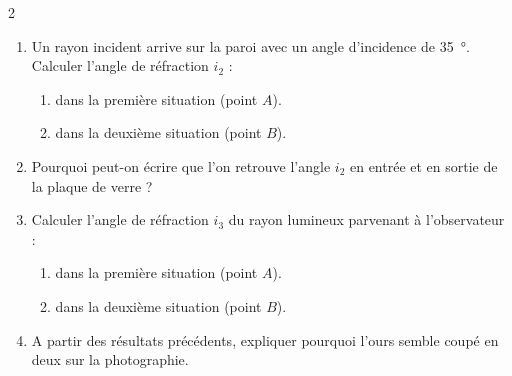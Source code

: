 \documentclass[a4paper,11pt,fleqn]{article}%
\begin{document}
\begin{multicols}{2}
\begin{enumerate}
    \item Un rayon incident arrive sur la paroi avec un angle d'incidence de \SI{35}{\degree}. Calculer l'angle de réfraction $i_2$ :
    \begin{enumerate}
        \item dans la première situation (point $A$).
        \item dans la deuxième situation (point $B$).
    \end{enumerate}
    \item Pourquoi peut-on écrire que l'on retrouve l'angle $i_2$ en entrée et en sortie de la plaque de verre ?
    \item Calculer l'angle de réfraction $i_3$ du rayon lumineux parvenant à l'observateur :
    \begin{enumerate}
        \item dans la première situation (point $A$).
        \item dans la deuxième situation (point $B$).
    \end{enumerate}
    \item A partir des résultats précédents, expliquer pourquoi l'ours semble coupé en deux sur la photographie.
\end{enumerate}
\end{multicols}
\end{document}

